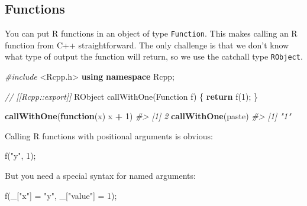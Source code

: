 \documentclass[]{book}
\newenvironment{Shaded}{\begin{snugshade}}{\end{snugshade}}
\newcommand{\CommentTok}[1]{\textcolor[rgb]{0.37,0.37,0.37}{\textit{#1}}}
\newcommand{\ControlFlowTok}[1]{\textcolor[rgb]{0.27,0.27,0.27}{\textbf{#1}}}
\newcommand{\DecValTok}[1]{\textcolor[rgb]{0.06,0.06,0.06}{#1}}
\newcommand{\ImportTok}[1]{#1}
\newcommand{\KeywordTok}[1]{\textcolor[rgb]{0.27,0.27,0.27}{\textbf{#1}}}
\newcommand{\NormalTok}[1]{#1}
\newcommand{\OperatorTok}[1]{\textcolor[rgb]{0.43,0.43,0.43}{\textbf{#1}}}
\newcommand{\PreprocessorTok}[1]{\textcolor[rgb]{0.37,0.37,0.37}{\textit{#1}}}
\newcommand{\StringTok}[1]{\textcolor[rgb]{0.5,0.5,0.5}{#1}}
\begin{document}
\hypertarget{functions-rcpp}{%
\subsection{Functions}\label{functions-rcpp}}


You can put R functions in an object of type \texttt{Function}. This makes calling an R function from C++ straightforward. The only challenge is that we don't know what type of output the function will return, so we use the catchall type \texttt{RObject}.

\begin{Shaded}
\begin{Highlighting}[]
\PreprocessorTok{#include }\ImportTok{<Rcpp.h>}
\KeywordTok{using} \KeywordTok{namespace}\NormalTok{ Rcpp;}

\CommentTok{// [[Rcpp::export]]}
\NormalTok{RObject callWithOne(Function f) \{}
  \ControlFlowTok{return}\NormalTok{ f(}\DecValTok{1}\NormalTok{);}
\NormalTok{\}}
\end{Highlighting}
\end{Shaded}

\begin{Shaded}
\begin{Highlighting}[]
\KeywordTok{callWithOne}\NormalTok{(}\ControlFlowTok{function}\NormalTok{(x) x }\OperatorTok{+}\StringTok{ }\DecValTok{1}\NormalTok{)}
\CommentTok{#> [1] 2}
\KeywordTok{callWithOne}\NormalTok{(paste)}
\CommentTok{#> [1] "1"}
\end{Highlighting}
\end{Shaded}

Calling R functions with positional arguments is obvious:

\begin{Shaded}
\begin{Highlighting}[]
\NormalTok{f(}\StringTok{"y"}\NormalTok{, }\DecValTok{1}\NormalTok{);}
\end{Highlighting}
\end{Shaded}

But you need a special syntax for named arguments:

\begin{Shaded}
\begin{Highlighting}[]
\NormalTok{f(_[}\StringTok{"x"}\NormalTok{] = }\StringTok{"y"}\NormalTok{, _[}\StringTok{"value"}\NormalTok{] = }\DecValTok{1}\NormalTok{);}
\end{Highlighting}
\end{Shaded}
\end{document}
